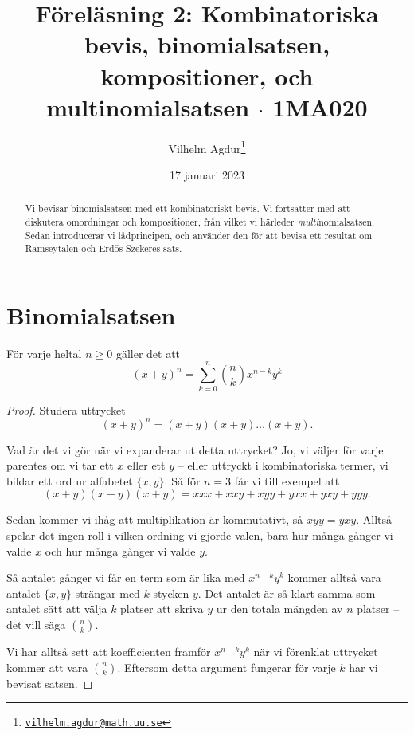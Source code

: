 \documentclass[nobib]{tufte-handout}
\title{Föreläsning 2: Kombinatoriska bevis, binomialsatsen, kompositioner, och multinomialsatsen $\cdot$ 1MA020}
\author[Vilhelm Agdur]{Vilhelm Agdur\thanks{\href{mailto:vilhelm.agdur@math.uu.se}{\nolinkurl{vilhelm.agdur@math.uu.se}}}}
\date{17 januari 2023}
\begin{document}
\maketitle%

\begin{abstract}
\noindent
Vi bevisar binomialsatsen med ett kombinatoriskt bevis. Vi fortsätter med att diskutera omordningar och kompositioner, från vilket vi härleder \emph{multi}nomialsatsen. Sedan introducerar vi lådprincipen, och använder den för att bevisa ett resultat om Ramseytalen och Erd\H{o}s-Szekeres sats.
\end{abstract}

\section{Binomialsatsen}

\begin{theorem}[Binomialsatsen]
  För varje heltal $n\geq 0$ gäller det att
  $$(x + y)^n = \sum_{k=0}^n \binom{n}{k}x^{n-k}y^k$$
  \begin{proof}
    Studera uttrycket
    $$(x + y)^n = (x + y)(x + y)\ldots(x + y).$$

    Vad är det vi gör när vi expanderar ut detta uttrycket? Jo, vi väljer för varje parentes om vi tar ett $x$ eller ett $y$ -- eller uttryckt i kombinatoriska termer, vi bildar ett ord ur alfabetet $\{x, y\}$. Så för $n = 3$ får vi till exempel att
    $$(x+y)(x+y)(x+y) = xxx + xxy + xyy + yxx + yxy + yyy.$$

    Sedan kommer vi ihåg att multiplikation är kommutativt, så $xyy = yxy$. Alltså spelar det ingen roll i vilken ordning vi gjorde valen, bara hur många gånger vi valde $x$ och hur många gånger vi valde $y$.

    Så antalet gånger vi får en term som är lika med $x^{n-k}y^k$ kommer alltså vara antalet $\{x, y\}$-strängar med $k$ stycken $y$. Det antalet är så klart samma som antalet sätt att välja $k$ platser att skriva $y$ ur den totala mängden av $n$ platser -- det vill säga $\binom{n}{k}$.

    Vi har alltså sett att koefficienten framför $x^{n-k}y^k$ när vi förenklat uttrycket kommer att vara $\binom{n}{k}$. Eftersom detta argument fungerar för varje $k$ har vi bevisat satsen.
  \end{proof}
\end{theorem}
\end{document}
